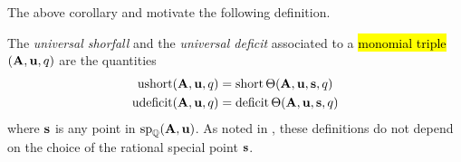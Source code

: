 \documentclass{amsart}
\begin{document}
The above corollary and  motivate the following definition.

\begin{definition}
\label{independence: D}  The \emph{universal shorfall} and the \emph{universal deficit} associated to a \hl{monomial triple} $(\mathbf{A}, \mathbf{u}, q)$ are the quantities
 \begin{align*}
  \operatorname{ushort}(\mathbf{A}, \mathbf{u}, q) & = \operatorname{short}\Theta( \mathbf{A}, \mathbf{u}, \mathbf{s}, q) \\ 
  \operatorname{udeficit}(\mathbf{A}, \mathbf{u}, q) & = \operatorname{deficit}\Theta( \mathbf{A}, \mathbf{u}, \mathbf{s}, q)  
 \end{align*}
where  $\mathbf{s}$ is any point in $\operatorname{sp}_{\mathbb{Q}}(\mathbf{A}, \mathbf{u})$.  As noted in , these definitions do not depend on the choice of the rational special point $\mathbf{s}$.
\end{definition}
\end{document}
